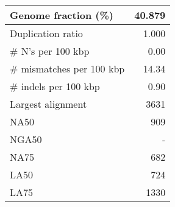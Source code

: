 \documentclass[12pt,a4paper]{article}
\begin{document}
\begin{table}[ht]
\begin{center}
\begin{tabular}{|l*{1}{|r}|}
Genome fraction (\%) & 40.879 \\ \hline
Duplication ratio & 1.000 \\ \hline
\# N's per 100 kbp & 0.00 \\ \hline
\# mismatches per 100 kbp & 14.34 \\ \hline
\# indels per 100 kbp & 0.90 \\ \hline
Largest alignment & 3631 \\ \hline
NA50 & 909 \\ \hline
NGA50 & - \\ \hline
NA75 & 682 \\ \hline
LA50 & 724 \\ \hline
LA75 & 1330 \\ \hline
\end{tabular}
\end{center}
\end{table}
\end{document}
